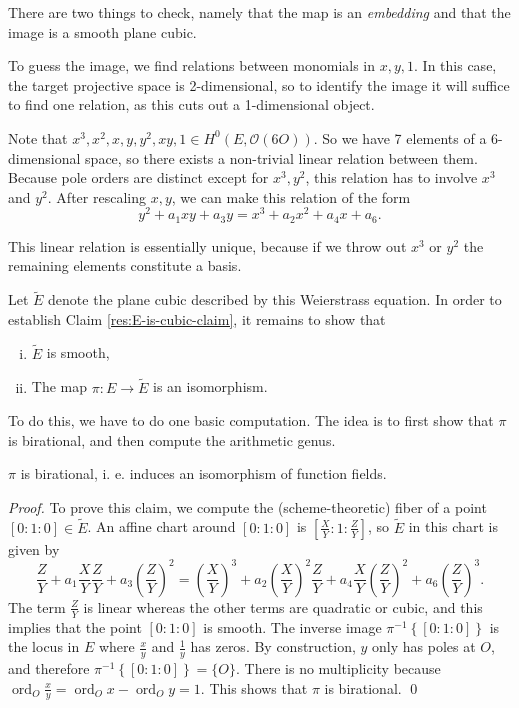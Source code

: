 There are two things to check, namely that the map is an \textit{embedding} and that the image is a smooth plane cubic.

To guess the image, we find relations between monomials in \( x,y,1 \).
In this case, the target projective space is 2-dimensional, so to identify the image it will suffice to find one relation, as this cuts out a 1-dimensional object.

Note that \( x^3,x^2,x,y,y^2,xy,1 \in H^0 \left( E, \mathcal{O}(6O) \right) \).
So we have 7 elements of a 6-dimensional space, so there exists a non-trivial linear relation between them.
Because pole orders are distinct except for \( x^3, y^2 \), this relation has to involve \( x^3 \) and \( y^2 \).
After rescaling \( x,y \), we can make this relation of the form
\[ y^2 + a_1 xy + a_3 y = x^3 + a_2 x^2 + a_4 x + a_6 . \]
\begin{remark}
  This linear relation is essentially unique, because if we throw out \( x^3 \) or \( y^2 \) the remaining elements constitute a basis.
\end{remark}
Let \( \widetilde{E} \) denote the plane cubic described by this Weierstrass equation.
In order to establish Claim \ref{res:E-is-cubic-claim}, it remains to show that
\begin{enumerate}[(i)]
\item \( \widetilde{E} \) is smooth,
\item The map \( \pi \colon E \to \widetilde{E} \) is an isomorphism.
\end{enumerate}
To do this, we have to do one basic computation. The idea is to first show that \( \pi \) is birational, and then compute the arithmetic genus.
\begin{claim}
  \( \pi \) is birational, i. e. induces an isomorphism of function fields.
\end{claim}
\textit{Proof.}
To prove this claim, we compute the (scheme-theoretic) fiber of a point \( [0:1:0] \in \widetilde{E} \).
An affine chart around \( [0:1:0] \) is \( \left[ \frac{X}{Y} : 1 : \frac{Z}{Y} \right] \), so \( \widetilde{E} \) in this chart is given by
\[ \frac{Z}{Y} + a_1 \frac{X}{Y} \frac{Z}{Y} + a_3 \left( \frac{Z}{Y} \right)^2 = \left( \frac{X}{Y} \right)^3 + a_2 \left( \frac{X}{Y} \right)^2 \frac{Z}{Y} + a_4 \frac{X}{Y} \left( \frac{Z}{Y} \right)^2 + a_6 \left( \frac{Z}{Y} \right)^3 . \]
The term \( \frac{Z}{Y} \) is linear whereas the other terms are quadratic or cubic, and this implies that the point \( [0:1:0] \) is smooth.
The inverse image \( \pi^{-1} \left\lbrace [0:1:0] \right\rbrace  \) is the locus in \( E \) where \( \frac{x}{y} \) and \( \frac{1}{y} \) has zeros.
By construction, \( y \) only has poles at \( O \), and therefore \( \pi^{-1} \left\lbrace [0:1:0] \right\rbrace = \lbrace O \rbrace \).
There is no multiplicity because \( \operatorname{ord}_O \frac{x}{y} = \operatorname{ord}_O x - \operatorname{ord}_O y = 1 \).
This shows that \( \pi \) is birational.
\qed

